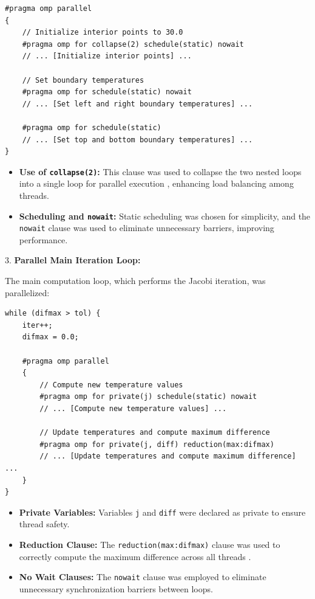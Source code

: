 \documentclass{article}
\begin{document}
\begin{lstlisting}[style=CStyle, caption={Parallel Initialization}]
#pragma omp parallel
{
    // Initialize interior points to 30.0
    #pragma omp for collapse(2) schedule(static) nowait
    // ... [Initialize interior points] ...

    // Set boundary temperatures
    #pragma omp for schedule(static) nowait
    // ... [Set left and right boundary temperatures] ...

    #pragma omp for schedule(static)
    // ... [Set top and bottom boundary temperatures] ...
}
\end{lstlisting}

    \begin{itemize}
        \item \textbf{Use of \texttt{collapse(2)}:} This clause was used to collapse the two nested loops into a single loop for parallel execution \parencite{openmp}, enhancing load balancing among threads.
        \item \textbf{Scheduling and \texttt{nowait}:} Static scheduling was chosen for simplicity, and the \texttt{nowait} clause was used to eliminate unnecessary barriers, improving performance.
    \end{itemize}

3. \textbf{Parallel Main Iteration Loop:}

   The main computation loop, which performs the Jacobi iteration, was parallelized:

\begin{lstlisting}[style=CStyle, caption={Parallel Main Iteration Loop}]
while (difmax > tol) {
    iter++;
    difmax = 0.0;

    #pragma omp parallel
    {
        // Compute new temperature values
        #pragma omp for private(j) schedule(static) nowait
        // ... [Compute new temperature values] ...

        // Update temperatures and compute maximum difference
        #pragma omp for private(j, diff) reduction(max:difmax)
        // ... [Update temperatures and compute maximum difference] ...
    }
}
\end{lstlisting}

    \begin{itemize}
        \item \textbf{Private Variables:} Variables \texttt{j} and \texttt{diff} were declared as private to ensure thread safety.
        \item \textbf{Reduction Clause:} The \texttt{reduction(max:difmax)} clause was used to correctly compute the maximum difference across all threads \parencite{chapman2007openmp}.
        \item \textbf{No Wait Clauses:} The \texttt{nowait} clause was employed to eliminate unnecessary synchronization barriers between loops.
    \end{itemize}
\end{document}
